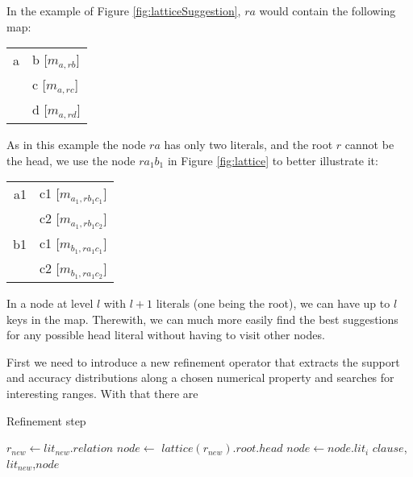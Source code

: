 In the example of Figure \ref{fig:latticeSuggestion}, $ra$ would contain the following map:

\begin{center}
  \begin{tabular}{r | l}
    a & b [$m_{a,rb}$] \\
      & c [$m_{a,rc}$] \\
      & d [$m_{a,rd}$]
  \end{tabular}
\end{center}

As in this example the node $ra$ has only two literals, and the root $r$ cannot be the head, we use the node $ra_1b_1$
in Figure \ref{fig:lattice} to better illustrate it:

\begin{center}
  \begin{tabular}{r | l}
    a1 	& c1 [$m_{a_1,rb_1c_1}$] \\
	& c2 [$m_{a_1,rb_1c_2}$] \\
    \hline
    b1	& c1 [$m_{b_1,ra_1c_1}$] \\
	& c2 [$m_{b_1,ra_1c_2}$]
  \end{tabular}
\end{center}

In a node at level $l$ with $l+1$ literals (one being the root), we can have up to $l$ keys in the map. Therewith, we
can much more easily find the best suggestions for any possible head literal without having to visit other nodes.

First we need to introduce a new refinement operator that extracts the support and accuracy distributions along a chosen
numerical property and searches for interesting ranges. With that there are

\begin{algorithm}[!h]
 \caption{Refinement step}
 \label{alg4}
 
  $r_{new} \leftarrow lit_{new}.relation$ \;
   {
    $node \leftarrow$ $lattice(r_{new}).root$.$head$\FuncSty{)} \;
     {
      $node \leftarrow node$.$lit_i$\FuncSty{)} \;
    }
    $clause$,$lit_{new}$,$node$\FuncSty{)} \;
  }
\end{algorithm}

